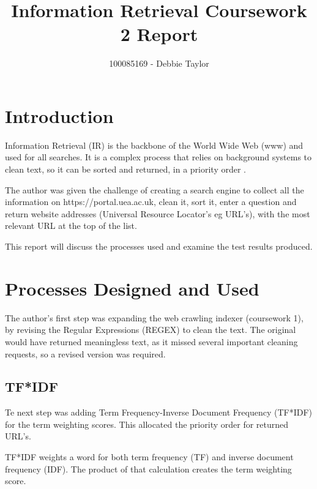 \documentclass{sig-alternate}
\begin{document}
\title{Information Retrieval Coursework 2 Report}

\author{
100085169 - Debbie Taylor
}

\maketitle


\section{Introduction}
Information Retrieval (IR) is the backbone of the World Wide Web (www) and used for all searches. It is a complex process that relies on background systems to clean text, so it can be sorted and returned, in a priority order \cite{baeza1999}.

The author was given the challenge of creating a search engine to collect all the information on https://portal.uea.ac.uk, clean it, sort it, enter a question and return website addresses (Universal Resource Locator's eg URL's), with the most relevant URL at the top of the list.  

This report will discuss the processes used and examine the test results produced.

\section{Processes Designed and Used} 
The author's first step was expanding the web crawling indexer (coursework 1), by revising the Regular Expressions (REGEX) to clean the text. The original would have returned meaningless text, as it missed several important cleaning requests, so a revised version was required.

\subsection{TF*IDF}
Te next step was adding Term Frequency-Inverse Document Frequency (TF*IDF) for the term weighting scores. This allocated the priority order for returned URL's.

TF*IDF weights a word for both term frequency (TF) and inverse document frequency (IDF). The product of that calculation creates the term weighting score. 
\end{document}

